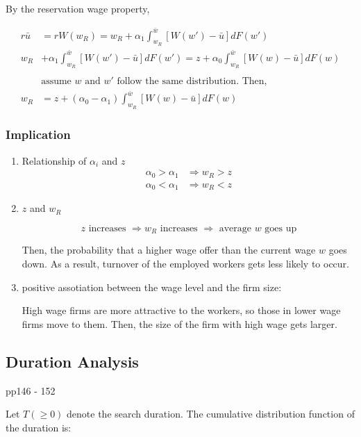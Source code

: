 \documentclass[dvipdfmx, 12pt]{article}
\begin{document}
By the reservation wage property,

\begin{align*}
  r \bar{u} &= r W(w_R) = w_R + \alpha_1 \int_{w_R}^{\bar{w}}[W(w') - \bar{u}]dF(w') \\
  w_R &+ \alpha_1\int_{w_R}^{\bar{w}}[W(w') - \bar{u}]dF(w') = z + \alpha_0 \int_{w_R}^{\bar{w}} [W(w)- \bar{u}] dF(w) \\
  \\
  &\text{assume } w \text{ and } w' \text{ follow the same distribution. Then, }\\
  w_R &= z + (\alpha_0 - \alpha_1) \int_{w_R}^{\bar{w}} [W(w)- \bar{u}] dF(w)
\end{align*}

\subsubsection{Implication}

\begin{enumerate}
  \item Relationship of $\alpha_i$ and $z$
  \begin{align*}
    \alpha_0 > \alpha_1 &\Longrightarrow w_R > z \\
    \alpha_0 < \alpha_1 &\Longrightarrow w_R < z
  \end{align*}

  \item $z$ and $w_R$

  \[
  z \text{ increases } \Longrightarrow w_R \text{ increases } \Longrightarrow \text{ average } w \text{ goes up}
  \]

  Then, the probability that a higher wage offer than the current wage $w$ goes down. As a result, turnover of the employed workers gets less likely to occur.

  \item positive assotiation between the wage level and the firm size:

  High wage firms are more attractive to the workers, so those in lower wage firms move to them. Then, the size of the firm with high wage gets larger.
\end{enumerate}

\subsection{Duration Analysis}

pp146 - 152

Let $T(\geq 0)$ denote the search duration. The cumulative distribution function of the duration is:
\end{document}
